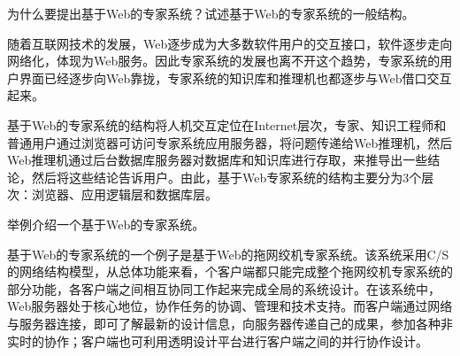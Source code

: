 \begin{question}
为什么要提出基于Web的专家系统？试述基于Web的专家系统的一般结构。
\end{question}
\begin{solution}
随着互联网技术的发展，Web逐步成为大多数软件用户的交互接口，软件逐步走向网络化，体现为Web服务。因此专家系统的发展也离不开这个趋势，专家系统的用户界面已经逐步向Web靠拢，专家系统的知识库和推理机也都逐步与Web借口交互起来。\par 
基于Web的专家系统的结构将人机交互定位在Internet层次，专家、知识工程师和普通用户通过浏览器可访问专家系统应用服务器，将问题传递给Web推理机，然后Web推理机通过后台数据库服务器对数据库和知识库进行存取，来推导出一些结论，然后将这些结论告诉用户。由此，基于Web专家系统的结构主要分为3个层次：浏览器、应用逻辑层和数据库层。
\end{solution}

\begin{question}
举例介绍一个基于Web的专家系统。
\end{question}
\begin{solution}
基于Web的专家系统的一个例子是基于Web的拖网绞机专家系统。该系统采用C/S的网络结构模型，从总体功能来看，个客户端都只能完成整个拖网绞机专家系统的部分功能，各客户端之间相互协同工作起来完成全局的系统设计。在该系统中，Web服务器处于核心地位，协作任务的协调、管理和技术支持。而客户端通过网络与服务器连接，即可了解最新的设计信息，向服务器传递自己的成果，参加各种非实时的协作；客户端也可利用透明设计平台进行客户端之间的并行协作设计。
\end{solution}

